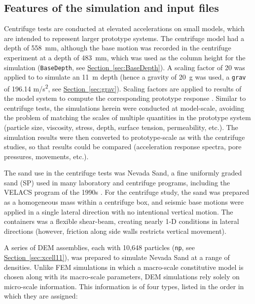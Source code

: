 \documentclass[letterpaper,11pt]{article}
\begin{document}
\subsection{Features of the simulation and input files}%
\label{sec:examplewave3}
%
Centrifuge tests are conducted at elevated accelerations
on small models, which
are intended to represent
larger prototype systems.
The centrifuge model had a depth of 558~mm,
although the base motion was recorded in the centrifuge
experiment at a depth of 483~mm, which was used as the
column height for the simulation
(\texttt{BaseDepth},
see \hyperref[sec:BaseDepth]{Section~\ref*{sec:BaseDepth}}).
A scaling factor of 20 was applied to to simulate an 11~m
depth (hence a gravity of 20~g was used, a \texttt{grav}
of 196.14 m/s\textsuperscript{2},
see \hyperref[sec:grav]{Section~\ref*{sec:grav}}).
Scaling factors are applied to results of the model system
to compute the corresponding prototype response \cite{Butterfield:2000a}.
Similar to centrifuge tests,
the simulations herein were conducted at model-scale,
avoiding the problem of matching the scales
of multiple quantities in the prototype system
(particle size, viscosity, stress, depth, surface tension,
permeability, etc.).
The simulation results were then converted to prototype-scale
as with the centrifuge studies,
so that results could be compared
(acceleration response spectra, pore pressures, movements, etc.).
%
\par
The sand use in the centrifuge tests was Nevada Sand,
a fine uniformly graded sand (SP)
used in many laboratory and centrifuge programs,
including the
VELACS program of the 1990s
\cite{Arulmoli1992a,Arulmoli_1994a,Kutter:1994a}.
For the centrifuge study, the
sand was prepared as a homogeneous mass within a centrifuge box,
and seismic base motions were applied
in a single lateral direction with no intentional
vertical motion.
The containers was a flexible shear-beam, creating nearly 1-D conditions
in lateral directions
(however, friction along side walls restricts vertical movement).
%
\par
A series of DEM assemblies,
each with 10,648 particles (\texttt{np},
see \hyperref[sec:xcell11]{Section~\ref*{sec:xcell11}}),
was prepared to simulate Nevada Sand
at a range of densities.
Unlike FEM simulations in which a macro-scale
constitutive model is chosen along
with its macro-scale parameters,
DEM simulations rely solely on micro-scale information.
This information is of four types,
listed in the order in which they are assigned:
\end{document}
